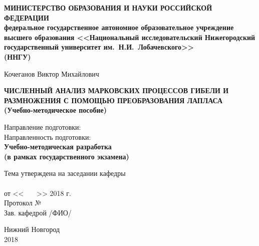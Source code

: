 \documentclass[12pt]{extarticle}
\begin{document}

\begin{titlepage}

  \begin{center}
    \textbf{МИНИСТЕРСТВО ОБРАЗОВАНИЯ И НАУКИ РОССИЙСКОЙ \\ ФЕДЕРАЦИИ\\
    федеральное государственное автономное образовательное учреждение\\
    высшего образования <<Национальный исследовательский Нижегородский\\ государственный университет им.~Н.И.~Лобачевского>>  \\(ННГУ)}
    
    \vfill 
    
    Кочеганов Виктор Михайлович
    \bigskip
    \bigskip
    \bigskip

    
     \textbf{ЧИСЛЕННЫЙ АНАЛИЗ МАРКОВСКИХ ПРОЦЕССОВ ГИБЕЛИ И \\
     РАЗМНОЖЕНИЯ С ПОМОЩЬЮ ПРЕОБРАЗОВАНИЯ ЛАПЛАСА\\
    (Учебно-методическое пособие)}
    
    \bigskip
    \bigskip
    Направление подготовки:\underline{\hspace{1cm}} \\
    Направленность подготовки:\underline{\hspace{1cm}}\\
    
 \vfill 
    \textbf{Учебно-методическая разработка\\
    (в рамках государственного экзамена)}
        \vfill 

        \begin{flushright}
    Тема утверждена на заседании кафедры\\
    \underline{\hspace{6.5cm}} \\
    от << \ \ \ >>\underline{\hspace{2cm}} 2018 г. \\
    Протокол №\underline{\hspace{0.5cm}} \\
   \medskip
    Зав. кафедрой \underline{\hspace{3cm}} /ФИО/\\
    \bigskip
    \end{flushright}


    Нижний Новгород \\ 2018
  \end{center}
  
\end{titlepage}
\end{document}

